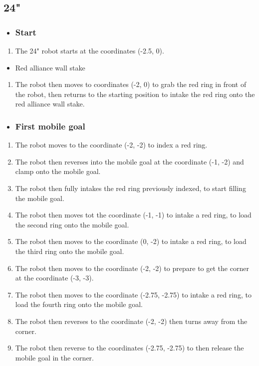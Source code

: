 \subsection{24"}
    \begin{itemize}
        \item \subsubsection{Start}
    \end{itemize}
    \begin{enumerate}
        \item The 24" robot starts at the coordinates (-2.5, 0).
    \end{enumerate}
\begin{itemize}
    \item Red alliance wall stake
\end{itemize}
        \begin{enumerate}
            \item The robot then moves to coordinates (-2, 0) to grab the red ring in front of the robot, then returns to the starting position to intake the red ring onto the red alliance wall stake.
        \end{enumerate}
    \begin{itemize}
        \item \subsubsection{First mobile goal}
    \end{itemize}
    \begin{enumerate}
        \item The robot moves to the coordinate (-2, -2) to index a red ring.
        \item The robot then reverses into the mobile goal at the coordinate (-1, -2) and clamp onto the mobile goal.
        \item  The robot then fully intakes the red ring previously indexed, to start filling the mobile goal.  
        \item The robot then moves tot the coordinate (-1, -1) to intake a red ring, to load the second ring onto the mobile goal.
        \item The robot then moves to the coordinate (0, -2) to intake a red ring, to load the third ring onto the mobile goal.
        \item The robot then moves to the coordinate (-2, -2) to prepare to get the corner at the coordinate (-3, -3).
        \item   The robot then moves to the coordinate (-2.75, -2.75) to intake a red ring, to load the fourth ring onto the mobile goal.
        \item   The robot then reverses to the coordinate (-2, -2) then turns away from the corner.
        \item   The robot then reverse to the coordinates (-2.75, -2.75) to then release the mobile goal in the corner.
    \end{enumerate}
